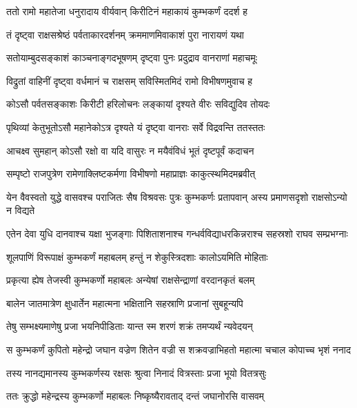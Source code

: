 
\twolineshloka
{ततो रामो महातेजा धनुरादाय वीर्यवान्}
{किरीटिनं महाकायं कुम्भकर्णं ददर्श ह} %

\twolineshloka
{तं दृष्ट्वा राक्षसश्रेष्ठं पर्वताकारदर्शनम्}
{क्रममाणमिवाकाशं पुरा नारायणं यथा} %

\twolineshloka
{सतोयाम्बुदसङ्काशं काञ्चनाङ्गदभूषणम्}
{दृष्ट्वा पुनः प्रदुद्राव वानराणां महाचमूः} %

\twolineshloka
{विद्रुतां वाहिनीं दृष्ट्वा वर्धमानं च राक्षसम्}
{सविस्मितमिदं रामो विभीषणमुवाच ह} %

\twolineshloka
{कोऽसौ पर्वतसङ्काशः किरीटी हरिलोचनः}
{लङ्कायां दृश्यते वीरः सविद्युदिव तोयदः} %

\twolineshloka
{पृथिव्यां केतुभूतोऽसौ महानेकोऽत्र दृश्यते}
{यं दृष्ट्वा वानराः सर्वे विद्रवन्ति ततस्ततः} %

\twolineshloka
{आचक्ष्व सुमहान् कोऽसौ रक्षो वा यदि वासुरः}
{न मयैवंविधं भूतं दृष्टपूर्वं कदाचन} %

\twolineshloka
{सम्पृष्टो राजपुत्रेण रामेणाक्लिष्टकर्मणा}
{विभीषणो महाप्राज्ञः काकुत्स्थमिदमब्रवीत्} %

\threelineshloka
{येन वैवस्वतो युद्धे वासवश्च पराजितः}
{सैष विश्रवसः पुत्रः कुम्भकर्णः प्रतापवान्}
{अस्य प्रमाणसदृशो राक्षसोऽन्यो न विद्यते} %

\twolineshloka
{एतेन देवा युधि दानवाश्च यक्षा भुजङ्गाः पिशिताशनाश्च}
{गन्धर्वविद्याधरकिन्नराश्च सहस्रशो राघव सम्प्रभग्नाः} %

\twolineshloka
{शूलपाणिं विरूपाक्षं कुम्भकर्णं महाबलम्}
{हन्तुं न शेकुस्त्रिदशाः कालोऽयमिति मोहिताः} %

\twolineshloka
{प्रकृत्या ह्येष तेजस्वी कुम्भकर्णो महाबलः}
{अन्येषां राक्षसेन्द्राणां वरदानकृतं बलम्} %

\twolineshloka
{बालेन जातमात्रेण क्षुधार्तेन महात्मना}
{भक्षितानि सहस्राणि प्रजानां सुबहून्यपि} %

\twolineshloka
{तेषु सम्भक्ष्यमाणेषु प्रजा भयनिपीडिताः}
{यान्त स्म शरणं शक्रं तमप्यर्थं न्यवेदयन्} %

\twolineshloka
{स कुम्भकर्णं कुपितो महेन्द्रो जघान वज्रेण शितेन वज्री}
{स शक्रवज्राभिहतो महात्मा चचाल कोपाच्च भृशं ननाद} %

\twolineshloka
{तस्य नानद्यमानस्य कुम्भकर्णस्य रक्षसः}
{श्रुत्वा निनादं वित्रस्ताः प्रजा भूयो वितत्रसुः} %

\twolineshloka
{ततः क्रुद्धो महेन्द्रस्य कुम्भकर्णो महाबलः}
{निष्कृष्यैरावताद् दन्तं जघानोरसि वासवम्} %

